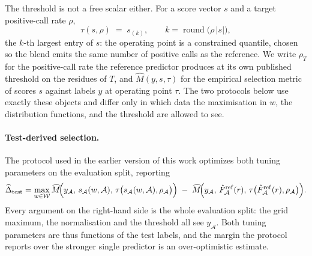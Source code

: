 The threshold is not a free scalar either. For a score vector \(s\) and a
target positive-call rate \(\rho\),
\begin{equation}
\label{eq:rate-threshold}
\tau(s,\rho)\;=\;s_{(k)},\qquad k=\operatorname{round}\!\bigl(\rho\,\lvert s\rvert\bigr),
\end{equation}
the \(k\)-th largest entry of \(s\): the operating point is a constrained
quantile, chosen so the blend emits the same number of positive calls as the
reference. We write \(\rho_{T}\) for the positive-call rate the reference
predictor produces at its own published threshold on the residues of \(T\), and
\(\widehat{M}(y,s,\tau)\) for the empirical selection metric of scores \(s\) against labels \(y\)
at operating point \(\tau\). The two protocols below use exactly these objects
and differ only in which data the maximisation in \(w\), the distribution
functions, and the threshold are allowed to see.

\paragraph{Test-derived selection.} The protocol used in the earlier version of
this work optimizes both tuning parameters on the evaluation split, reporting
\begin{equation}
\label{eq:test-derived}
\widehat{\Delta}_{\mathrm{test}}
=\max_{w\in\mathcal{W}}
\widehat{M}\!\Bigl(y_{\mathcal{A}},\,s_{\mathcal{A}}(w,\mathcal{A}),\,
\tau\bigl(s_{\mathcal{A}}(w,\mathcal{A}),\rho_{\mathcal{A}}\bigr)\Bigr)
\;-\;
\widehat{M}\!\Bigl(y_{\mathcal{A}},\,\hat{F}^{\mathrm{ref}}_{\mathcal{A}}(r),\,
\tau\bigl(\hat{F}^{\mathrm{ref}}_{\mathcal{A}}(r),\rho_{\mathcal{A}}\bigr)\Bigr).
\end{equation}
Every argument on the right-hand side is the whole evaluation split: the grid
maximum, the normalisation and the threshold all see \(y_{\mathcal{A}}\). Both
tuning parameters are thus functions of the test labels, and the margin the
protocol reports over the stronger single predictor is an over-optimistic
estimate.

